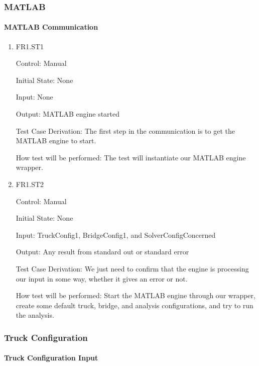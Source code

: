 \documentclass[12pt, titlepage]{article}
\begin{document}
\subsubsection{MATLAB}

\paragraph{MATLAB Communication}

\begin{enumerate}

  \item{FR1.ST1\\}

  Control: Manual

  Initial State: None

  Input: None

  Output: MATLAB engine started

  Test Case Derivation: The first step in the communication is to get the MATLAB engine
  to start.

  How test will be performed: The test will instantiate our MATLAB engine wrapper.

  \item{FR1.ST2\\}

  Control: Manual

  Initial State: None

  Input: TruckConfig1, BridgeConfig1, and SolverConfigConcerned

  Output: Any result from standard out or standard error

  Test Case Derivation: We just need to confirm that the engine is processing our
  input in some way, whether it gives an error or not.

  How test will be performed: Start the MATLAB engine through our wrapper, create
  some default truck, bridge, and analysis configurations, and try to run the analysis.

\end{enumerate}

\subsubsection{Truck Configuration}

\paragraph{Truck Configuration Input}
\end{document}
